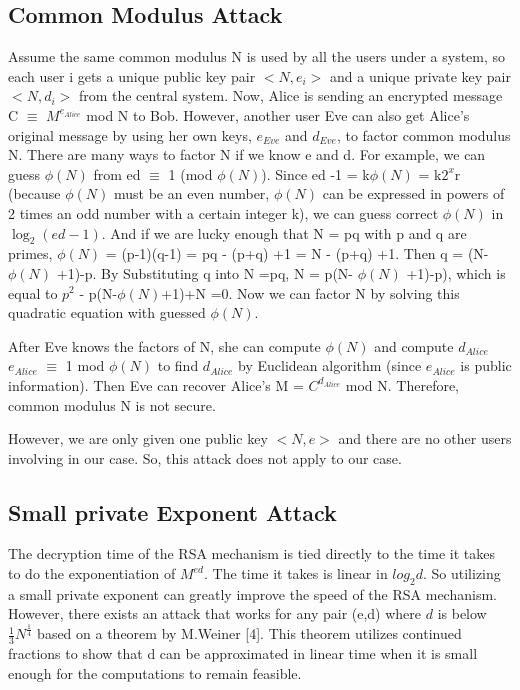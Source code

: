 \documentclass[12pt]{article} %
\begin{document}
\subsection{ Common Modulus Attack}
		Assume the same common modulus N is used by all the users under a system, so each user i gets a unique public key pair $<N,e_i>$ and a unique private key pair $<N,d_i>$ from the central system.
		Now, Alice is sending an encrypted message C $\equiv$ $M^{e_{Alice}}$ mod N to Bob. 
		However, another user Eve can also get Alice's original message by using her own keys, ${e_{Eve}}$ and ${d_{Eve}}$, to factor common modulus N. There are many ways to factor N if we know e and d.
		For example, we can guess $\phi(N)$  from ed $\equiv$ 1 (mod $\phi(N)$). Since ed -1 = k$\phi(N)$ = k$2^x$r (because $\phi(N)$ must be an even number, $\phi(N)$ can be expressed in powers of 2 times an odd number with a certain integer k),
		we can guess correct $\phi(N)$ in $\log_2(ed-1)$.
		And if we are lucky enough that N = pq with p and q are primes, $\phi(N)$ = (p-1)(q-1) = pq - (p+q) +1 = N - (p+q) +1. Then q = (N- $\phi(N)$ +1)-p. By Substituting q into N =pq, N = p(N- $\phi(N)$ +1)-p), which is equal to $p^2$ - p(N-$\phi(N)$+1)+N =0.
		Now we can factor N by solving this quadratic equation with guessed $\phi(N)$.
		
		After Eve knows the factors of N, she can compute $\phi(N)$ and compute ${d_{Alice}}$ ${e_{Alice}}$ $\equiv$ 1 mod $\phi(N)$ to find ${d_{Alice}}$ by Euclidean algorithm (since ${e_{Alice}}$ is public information).
		Then Eve can recover Alice's M = $C^{d_{Alice}}$ mod N.
		Therefore, common modulus N is not secure.

		However, we are only given one public key $<N,e>$ and there are no other users involving in our case. So, this attack does not apply to our case. 

\subsection{Small private Exponent Attack}
        The decryption time of the RSA mechanism is tied directly to the time it takes to do the exponentiation of $ M^{ed} $. The time it takes is linear in $log_{2}d $. So utilizing a small private exponent can greatly improve the speed of the RSA mechanism. However, there exists an attack that
works for any pair (e,d) where $d$ is below $ \frac{1}{3}N^{\frac{1}{4}} $ based on a theorem by M.Weiner [4].
This theorem utilizes continued fractions to show that d can be approximated in linear time when it is small enough for the computations to remain feasible. 
\end{document}

